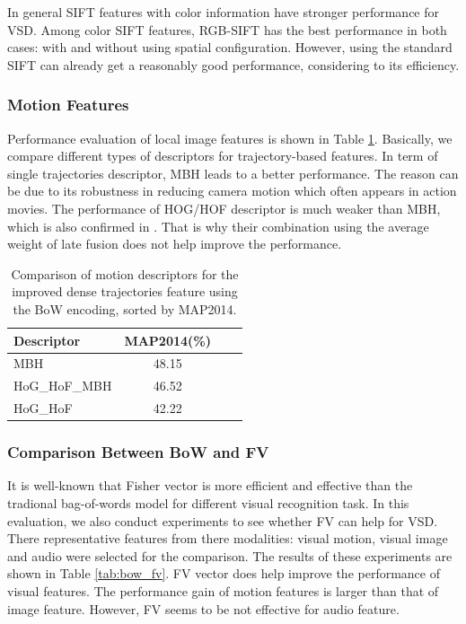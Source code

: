 \documentclass[twocolumn]{bmcart}%
\begin{document}
In general SIFT features with color information have stronger performance for VSD. Among color SIFT features, RGB-SIFT has the best performance in both cases: with and without using spatial configuration. However, using the standard SIFT can already get a reasonably good performance, considering to its efficiency. 


\subsubsection{Motion Features}
Performance evaluation of local image features is shown in Table \ref{tab:motion_bow}. Basically, we compare different types of descriptors for trajectory-based features. In term of single trajectories descriptor, MBH leads to a better performance. The reason can be due to its robustness in reducing camera motion which often appears in action movies. The performance of HOG/HOF descriptor is much weaker than MBH, which is also confirmed in \cite{wang2013action}. That is why their combination using the average weight of late fusion does not help improve the performance.
\begin{table}
	\centering
	\caption{Comparison of motion descriptors for the improved dense trajectories feature using the BoW encoding, sorted by MAP2014.}
	\begin{tabular}{lccc}
		\hline
		Descriptor & MAP2014(\%) \\ \hline
		MBH   & 48.15 \\
		HoG\_HoF\_MBH & 46.52 \\
		HoG\_HoF & 42.22 \\ \hline
	\end{tabular}%
	\label{tab:motion_bow}%
\end{table}%

\subsubsection{Comparison Between BoW and FV}
It is well-known that Fisher vector is more efficient and effective than the tradional bag-of-words model for different visual recognition task. In this evaluation, we also conduct experiments to see whether FV can help for VSD. There representative features from there modalities: visual motion, visual image and audio were selected for the comparison. The results of these experiments are shown in Table \ref{tab:bow_fv}. FV vector does help improve the performance of visual features. The performance gain of motion features is larger than that of image feature. However, FV seems to be not effective for audio feature.
\end{document}
